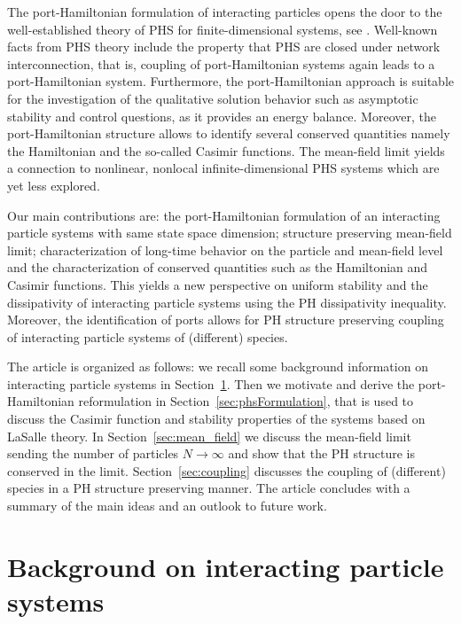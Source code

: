\documentclass[11pt]{article}
\begin{document}
\begin{bibunit}[abbrv]
The port-Hamiltonian formulation of interacting particles opens the door to the well-established theory of PHS for finite-dimensional systems, see
\cite{vanDerSchaft06,EbMS07,DuinMacc09}.  Well-known facts from PHS theory include the property that PHS are closed under network interconnection, that is, coupling of port-Hamiltonian systems again leads to a port-Hamiltonian system. Furthermore, the port-Hamiltonian approach is suitable for the investigation of  the qualitative solution behavior such as asymptotic stability and control questions, as it provides an energy balance. Moreover, the port-Hamiltonian structure allows to identify several conserved quantities namely the Hamiltonian and the so-called Casimir functions. The mean-field limit yields a connection to nonlinear, nonlocal infinite-dimensional PHS systems which are yet less explored.

Our main contributions are: the port-Hamiltonian formulation of an interacting particle systems with same state space dimension; structure preserving mean-field limit; characterization of long-time behavior on the particle and mean-field level and the characterization of conserved quantities such as the Hamiltonian and Casimir functions. This yields a new perspective on uniform stability and the dissipativity of interacting particle systems using the PH dissipativity inequality. Moreover, the identification of ports allows for PH structure preserving coupling of interacting particle systems of (different) species.

The article is organized as follows: we recall some background information on interacting particle systems in Section~\ref{sec:background}. Then we motivate and derive the port-Hamiltonian reformulation in Section~\ref{sec:phsFormulation}, that is used to discuss the Casimir function and stability properties of the systems based on LaSalle theory. In Section~\ref{sec:mean_field} we discuss the mean-field limit sending the number of particles $N\rightarrow\infty$ and show that the PH structure is conserved in the limit. Section~\ref{sec:coupling} discusses the coupling of (different) species in a PH structure preserving manner. The article concludes with a summary of the main ideas and an outlook to future work. 



\section{Background on interacting particle systems}\label{sec:background}


\end{bibunit}
\end{document}
